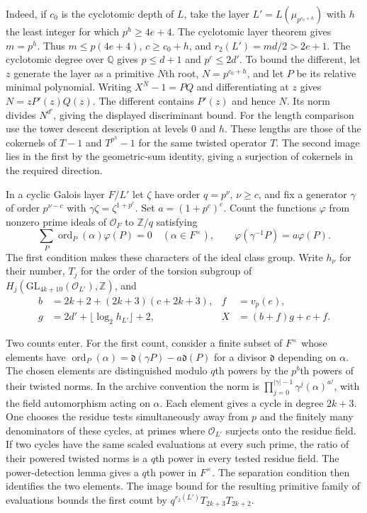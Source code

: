 Indeed, if $c_0$ is the cyclotomic depth of $L$, take the layer
$L'=L(\mu_{p^{c_0+h}})$ with $h$ the least integer for which
$p^h\ge4e+4$. The cyclotomic layer theorem gives $m=p^h$.
Thus $m\le p(4e+4)$, $c\ge c_0+h$, and $r_2(L')=md/2>2e+1$.
The cyclotomic degree over $\mathbb Q$ gives
$p\le d+1$ and $p^c\le 2d'$. To bound the different, let $z$ generate
the layer as a primitive $N$th root, $N=p^{c_0+h}$, and let $P$ be
its relative minimal polynomial. Writing $X^N-1=PQ$ and differentiating
at $z$ gives $N=zP'(z)Q(z)$. The different contains $P'(z)$ and hence
$N$. Its norm divides $N^{d'}$, giving the displayed discriminant bound.
For the length comparison use the tower descent description at levels
$0$ and $h$. These lengths are those of the cokernels of $T-1$ and
$T^{p^h}-1$ for the same twisted operator $T$. The second image lies in
the first by the geometric-sum identity, giving a surjection of
cokernels in the required direction.

In a cyclic Galois layer $F/L'$ let $\zeta$ have order $q=p^\nu$,
$\nu\ge c$, and fix a generator $\gamma$ of order $p^{\nu-c}$
with $\gamma\zeta=\zeta^{1+p^c}$. Set $a=(1+p^c)^e$. Count the
functions $\varphi$ from nonzero prime ideals of $\mathcal O_F$ to
$\mathbb Z/q$ satisfying
\[
 \sum_P\operatorname{ord}_P(\alpha)\varphi(P)=0\quad(\alpha\in F^\times),
 \qquad \varphi(\gamma^{-1}P)=a\varphi(P).
\]
The first condition makes these characters of the ideal class group.
Write $h_\nu$ for their number, $T_j$ for the order of the torsion
subgroup of $H_j(\mathrm{GL}_{4k+10}(\mathcal O_{L'}),\mathbb Z)$, and
\begin{align*}
 b&=2k+2+(2k+3)(c+2k+3), & f&=v_p(e),\\
 g&=2d'+\lfloor\log_2 h_{L'}\rfloor+2, & X&=(b+f)g+c+f .
\end{align*}

Two counts enter. For the first count, consider a finite subset of
$F^\times$ whose elements have
$\operatorname{ord}_P(\alpha)=\mathfrak d(\gamma P)-a\mathfrak d(P)$
for a divisor $\mathfrak d$ depending on $\alpha$. The chosen elements
are distinguished modulo $q$th powers by the $p^b$th powers of their
twisted norms. In the archive convention the norm is
$\prod_{j=0}^{|\gamma|-1}\gamma^j(\alpha)^{a^j}$, with the field
automorphism acting on $\alpha$. Each element gives a cycle
in degree $2k+3$. One chooses the residue tests simultaneously away
from $p$ and the finitely many denominators of these cycles, at primes
where $\mathcal O_{L'}$ surjects onto the residue field. If two cycles
have the same scaled evaluations at every such prime, the ratio of their
powered twisted norms is a $q$th power in every tested residue field.
The power-detection lemma gives a $q$th power in $F^\times$.
The separation condition then identifies the two elements. The image
bound for the resulting primitive family of evaluations bounds the first
count by $q^{r_2(L')}T_{2k+3}T_{2k+2}$.

